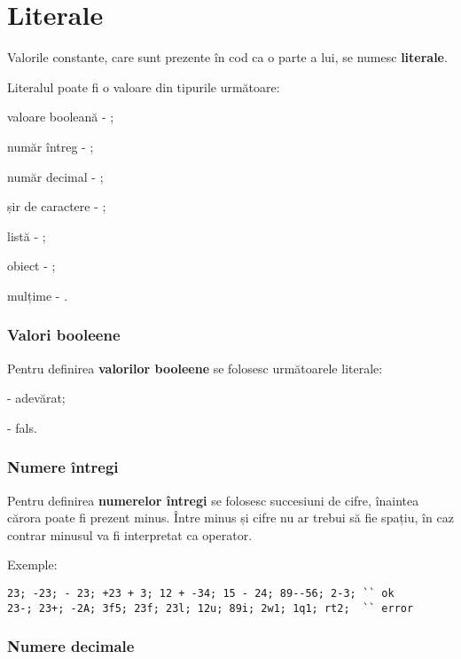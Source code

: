 \section{Literale}

Valorile constante, care sunt prezente în cod ca o parte a lui, se numesc {\bf literale}.

Literalul poate fi o valoare din tipurile următoare:

\begin{icItems}
	\item
		valoare booleană - \bool{};
	\item
		număr întreg - \integer{};
	\item
		număr decimal - \double{};
	\item
		șir de caractere - \str{};
	\item
		listă - \listtype{};
	\item
		obiect - \object{};
	\item
		mulțime - \set{}.
\end{icItems}

\subsubsection{Valori booleene}

Pentru definirea {\bf valorilor booleene} se folosesc următoarele literale:
\begin{icItems}
	\item \true{} - adevărat;
	\item \false{} - fals.
\end{icItems}

\subsubsection{Numere întregi}

Pentru definirea {\bf numerelor întregi} se folosesc succesiuni de cifre, înaintea cărora poate fi prezent minus. Între minus și cifre nu ar trebui să fie spațiu, în caz contrar minusul va fi interpretat ca operator.

\noindent Exemple:
\begin{lstlisting}[numbers=none]
23; -23; - 23; +23 + 3; 12 + -34; 15 - 24; 89--56; 2-3; `` ok
23-; 23+; -2А; 3f5; 23f; 23l; 12u; 89i; 2w1; 1q1; rt2;  `` error
\end{lstlisting}

\subsubsection{Numere decimale}


